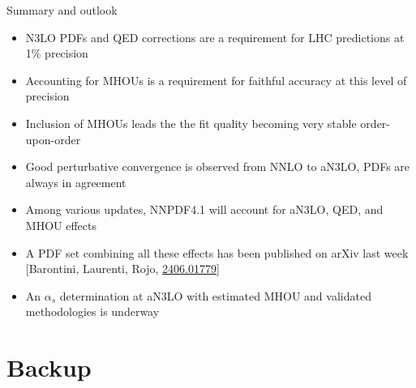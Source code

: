 \documentclass[8pt,t]{beamer}
\begin{document}
\begin{frame}[c]{Summary and outlook}
  \begin{itemize}\setlength{\itemsep}{10pt}
    \item N3LO PDFs and QED corrections are a requirement for LHC predictions at 1\% precision
    \item Accounting for MHOUs is a requirement for faithful accuracy at this level of precision
    \item Inclusion of MHOUs leads the the fit quality becoming very stable order-upon-order
    \item Good perturbative convergence is observed from NNLO to aN3LO, PDFs are always in agreement
    \item Among various updates, NNPDF4.1 will account for aN3LO, QED, and MHOU effects
    \item A PDF set combining all these effects has been published on arXiv last week {\color{gray} \footnotesize [Barontini, Laurenti, Rojo, \hyperlink{https://arxiv.org/abs/2406.01779}{2406.01779}]}
    \item An $\alpha_s$ determination at aN3LO with estimated MHOU and validated methodologies is underway
  \end{itemize}

  \vspace*{7em}
\end{frame}



\appendix
\section{Backup}


\end{document}
